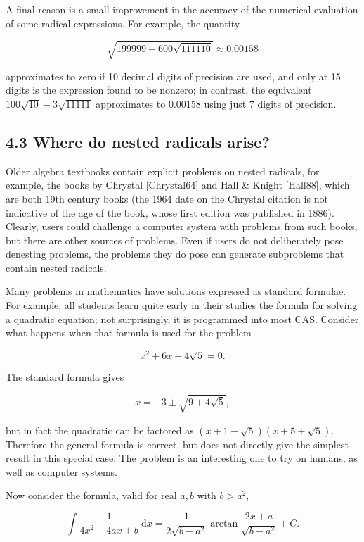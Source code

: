 \documentclass[11pt,letterpaper]{article}
\begin{document}
A final reason is a small improvement in the accuracy of the numerical evaluation of some radical expressions. For example, the quantity

\[
\sqrt{199999-600 \sqrt{111110}} \approx 0.00158
\]

approximates to zero if 10 decimal digits of precision are used, and only at 15 digits is the expression found to be nonzero; in contrast, the equivalent $100 \sqrt{10}-3 \sqrt{11111}$ approximates to 0.00158 using just 7 digits of precision.

\subsection*{4.3 Where do nested radicals arise?}
Older algebra textbooks contain explicit problems on nested radicals, for example, the books by Chrystal [Chrystal64] and Hall \& Knight [Hall88], which are both 19th century books (the 1964 date on the Chrystal citation is not indicative of the age of the book, whose first edition was published in 1886). Clearly, users could challenge a computer system with problems from such books, but there are other sources of problems. Even if users do not deliberately pose denesting problems, the problems they do pose can generate subproblems that contain nested radicals.

Many problems in mathematics have solutions expressed as standard formulae. For example, all students learn quite early in their studies the formula for solving a quadratic equation; not surprisingly, it is programmed into most CAS. Consider what happens when that formula is used for the problem

\[
x^{2}+6 x-4 \sqrt{5}=0 .
\]

The standard formula gives

\[
x=-3 \pm \sqrt{9+4 \sqrt{5}},
\]


but in fact the quadratic can be factored as $(x+1-\sqrt{5})(x+5+\sqrt{5})$. Therefore the general formula is correct, but does not directly give the simplest result in this special case. The problem is an interesting one to try on humans, as well as computer systems.

Now consider the formula, valid for real $a, b$ with $b>a^{2}$,


\begin{equation*}
\int \frac{1}{4 x^{2}+4 a x+b} \mathrm{~d} x=\frac{1}{2 \sqrt{b-a^{2}}} \arctan \frac{2 x+a}{\sqrt{b-a^{2}}}+C. \tag{4.7}\label{eq:4.7}
\end{equation*}
\end{document}
